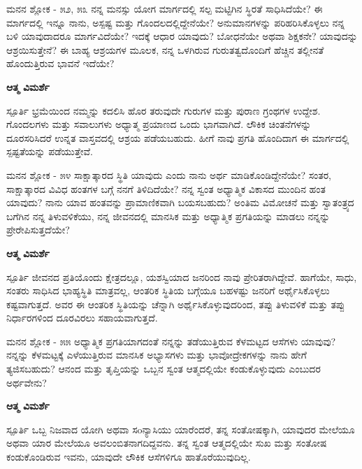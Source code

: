 \newpage
\begin{mananam}{\mananamfont \large{ಮನನ ಶ್ಲೋಕ - ೫೨, ೫೩}}
\footnotesize \mananamtext ನನ್ನ ಮನಸ್ಸು ಯೋಗ ಮಾರ್ಗದಲ್ಲಿ ಸಲ್ಪ ಮಟ್ಟಿಗಿನ ಸ್ಥಿರತೆ ಸಾಧಿಸಿದೆಯೇ? ಈ ಮಾರ್ಗದಲ್ಲಿ ಇನ್ನೂ ನಾನು, ಅಸ್ಪಷ್ಟ  ಮತ್ತು ಗೊಂದಲದಲ್ಲಿದ್ದೇನೆಯೇ? ಅನುಮಾನಗಳನ್ನು ಪರಿಹರಿಸಿಕೊಳ್ಳಲು ನನ್ನ ಬಳಿ ಯಾವುದಾದರೂ ಮಾರ್ಗವಿದೆಯೇ? ಇದಕ್ಕೆ ಆಧಾರ ಯಾವುದು? ಬೋಧನೆಯೇ ಅಥವಾ ಶಿಕ್ಷಕನೇ? ಯಾವುದನ್ನು ಆಶ್ರಯಿಸುತ್ತೇನೆ? ಈ ಬಾಹ್ಯ ಆಶ್ರಯಗಳ ಮೂಲಕ, ನನ್ನ ಒಳಗಿರುವ ಗುರುತತ್ವದೊಂದಿಗೆ ಹೆಚ್ಚಿನ ತಲ್ಲೀನತೆ ಹೊಂದುತ್ತಿರುವ ಭಾವನೆ ಇದೆಯೇ?
\end{mananam}
\WritingHand\enspace\textbf{ಆತ್ಮ ವಿಮರ್ಶೆ}
\begin{inspiration}{\mananamfont \large ಸ್ಪೂರ್ತಿ}
\footnotesize \mananamtext ಭ್ರಮೆಯಿಂದ ನಮ್ಮನ್ನು ಕದಲಿಸಿ ಹೊರ ತರುವುದೇ ಗುರುಗಳ ಮತ್ತು ಪುರಾಣ ಗ್ರಂಥಗಳ ಉದ್ದೇಶ. ಗೊಂದಲಗಳು ಮತ್ತು ಸವಾಲುಗಳು ಅಧ್ಯಾತ್ಮ ಪ್ರಯಾಣದ ಒಂದು ಭಾಗವಾಗಿದೆ. ಲೌಕಿಕ ಚಿಂತನೆಗಳನ್ನು ದೂರಸರಿಸಿದರೆ ಉನ್ನತ ವಾಸ್ತವದಲ್ಲಿ ಆಶ್ರಯ ಪಡೆಯಬಹುದು. ಹೀಗೆ ನಾವು ಪ್ರಗತಿ ಹೊಂದಿದಾಗ ಈ ಮಾರ್ಗದಲ್ಲಿ ಸ್ಪಷ್ಟತೆಯನ್ನು ಪಡೆಯುತ್ತೇವೆ.
\end{inspiration}
\newpage

\begin{mananam}{\mananamfont \large ಮನನ ಶ್ಲೋಕ - ೫೪}
\footnotesize \mananamtext ಸಾಕ್ಷಾತ್ಕಾರದ ಸ್ಥಿತಿ ಯಾವುದು ಎಂದು ನಾನು ಅರ್ಥ ಮಾಡಿಕೊಂಡಿದ್ದೇನೆಯೇ? ಸಂತರ,  ಸಾಕ್ಷಾತ್ಕಾರದ  ವಿವಿಧ ಹಂತಗಳ ಬಗ್ಗೆ ನನಗೆ ತಿಳಿದಿದೆಯೇ? ನನ್ನ ಸ್ವಂತ ಅಧ್ಯಾತ್ಮಿಕ ವಿಕಾಸದ ಮುಂದಿನ ಹಂತ ಯಾವುದು? ನಾನು ಯಾವ ಹಂತವನ್ನು ಪ್ರಾಮಾಣಿಕವಾಗಿ ಬಯಸಬಹುದು? ಅಂತಿಮ ವಿಮೋಚನೆ ಮತ್ತು ಸ್ವಾತಂತ್ರ್ಯದ ಬಗೆಗಿನ ನನ್ನ ತಿಳುವಳಿಕೆಯು,  ನನ್ನ ಜೀವನದಲ್ಲಿ ಮಾನಸಿಕ ಮತ್ತು ಅಧ್ಯಾತ್ಮಿಕ ಪ್ರಗತಿಯನ್ನು ಮಾಡಲು  ನನ್ನನ್ನು ಪ್ರೇರೇಪಿಸುತ್ತದೆಯೇ?
\end{mananam}
\WritingHand\enspace\textbf{ಆತ್ಮ ವಿಮರ್ಶೆ}
\begin{inspiration}{\mananamfont \large ಸ್ಪೂರ್ತಿ}
\footnotesize \mananamtext ಜೀವನದ ಪ್ರತಿಯೊಂದು ಕ್ಷೇತ್ರದಲ್ಲೂ,  ಯಶಸ್ವಿಯಾದ ಜನರಿಂದ ನಾವು ಪ್ರೇರಿತರಾಗಿದ್ದೇವೆ. ಹಾಗೆಯೇ, ಸಾಧು, ಸಂತರು ಸಾಧಿಸಿದ ಭಾಹ್ಯಸ್ಥಿತಿ ಮಾತ್ರವಲ್ಲ, ಆಂತರಿಕ ಸ್ಥಿತಿಯ ಬಗ್ಗೆಯೂ ಬಹಳಷ್ಟು ಜನರಿಗೆ ಅರ್ಥೈಸಿಕೊಳ್ಳಲು ಕಷ್ಟವಾಗುತ್ತದೆ. ಅವರ ಈ ಆಂತರಿಕ ಸ್ಥಿತಿಯನ್ನು ಚೆನ್ನಾಗಿ ಅರ್ಥೈಸಿಕೊಳ್ಳುವುದರಿಂದ, ತಪ್ಪು ತಿಳುವಳಿಕೆ ಮತ್ತು ತಪ್ಪು ನಿರ್ಧಾರಗಳಿಂದ ದೂರವಿರಲು ಸಹಾಯವಾಗುತ್ತದೆ.
\end{inspiration}
\newpage

\begin{mananam}{\mananamfont \large ಮನನ ಶ್ಲೋಕ - ೫೫}
\footnotesize \mananamtext ಅಧ್ಯಾತ್ಮಿಕ ಪ್ರಗತಿಯಾಗದಂತೆ ನನ್ನನ್ನು ತಡೆಯುತ್ತಿರುವ ಕೆಳಮಟ್ಟದ ಆಸೆಗಳು ಯಾವುವು? ನನ್ನನ್ನು ಕೆಳಮಟ್ಟಕ್ಕೆ ಎಳೆಯುತ್ತಿರುವ ಮಾನಸಿಕ ಅಭ್ಯಾಸಗಳು ಮತ್ತು ಭಾವೋದ್ರೇಕಗಳನ್ನು   ನಾನು ಹೇಗೆ ತ್ಯಜಿಸಬಹುದು? ಆನಂದ ಮತ್ತು ತೃಪ್ತಿಯನ್ನು ಒಬ್ಬನ ಸ್ವಂತ ಆತ್ಮದಲ್ಲಿಯೇ ಕಂಡುಕೊಳ್ಳುವುದು ಎಂಬುದರ ಅರ್ಥವೇನು?
\end{mananam}
\WritingHand\enspace\textbf{ಆತ್ಮ ವಿಮರ್ಶೆ}
\begin{inspiration}{\mananamfont \large ಸ್ಪೂರ್ತಿ}
\footnotesize \mananamtext  ಒಬ್ಬ ನಿಜವಾದ ಯೋಗಿ ಅಥವಾ ಸoನ್ಯಾಸಿಯು ಯಾರೆಂದರೆ, ತನ್ನ ಸಂತೋಷಕ್ಕಾಗಿ, ಯಾವುದರ ಮೇಲೆಯೂ ಅಥವಾ ಯಾರ ಮೇಲೆಯೂ ಅವಲಂಬಿತನಾಗದಿದ್ದವನು. ತನ್ನ ಸ್ವಂತ ಆತ್ಮದಲ್ಲಿಯೇ ಸುಖ ಮತ್ತು ಸಂತೋಷ ಕಂಡುಕೊಂಡಿರುವ ಇವನು, ಯಾವುದೇ ಲೌಕಿಕ ಆಸೆಗಳಿಗೂ ಹಾತೊರೆಯುವುದಿಲ್ಲ.
\end{inspiration}
\newpage

